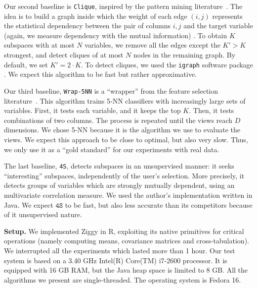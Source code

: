 Our second baseline is \texttt{Clique}, inspired by the pattern mining
literature~\cite{xie2010max}. The idea is to build a graph inside which
the weight of each edge $(i,j)$ represents the statistical dependency between
the pair of columns $i,j$ and the target variable (again, we measure dependency with
the mutual information) . To obtain $K$ subspaces with at most $N$ variables,
we remove all the edges except the $K' > K$ strongest, and detect cliques of at
most $N$ nodes in the remaining graph. By default, we set $K' = 2\cdot K$. To detect
cliques, we used the \texttt{igraph} software package . We expect this
algorithm to be fast but rather approximative.

Our third baseline, \texttt{Wrap-5NN} is a ``wrapper'' from the feature
selection literature~\cite{guyon2003introduction}. This algorithm trains 5-NN
classifiers with increasingly large sets of variables. First, it tests each
variable, and it keeps the top $K$. Then, it tests combinations of two columns.
The process is repeated until the views reach $D$ dimensions. We chose 5-NN
because it is the algorithm we use to evaluate the views. We expect this
approach to be close to optimal, but also very slow. Thus, we only use it as a
``gold standard'' for our experiments with real data.

The last baseline, \texttt{4S}, detects subspaces in an unsupervised manner: it
seeks ``interesting'' subspaces, independently of the user's selection. More
precisely, it detects groups of variables which are strongly mutually
dependent, using an multivariate correlation measure. We used
the author's implementation written in Java. We expect $\texttt{4S}$ to be
fast, but also less accurate than its competitors because of it unsupervised
nature.

\textbf{Setup.} We implemented Ziggy in R, exploiting its native primitives for critical
operations (namely computing means, covariance matrices and cross-tabulation).
We interrupted all the experiments which lasted more than 1 hour. Our test
system is based on a 3.40 GHz Intel(R) Core(TM) i7-2600 processor. It is
equipped with 16 GB RAM, but the Java heap space is limited to 8 GB. All the
algorithms we present are single-threaded. The operating system is Fedora 16.

